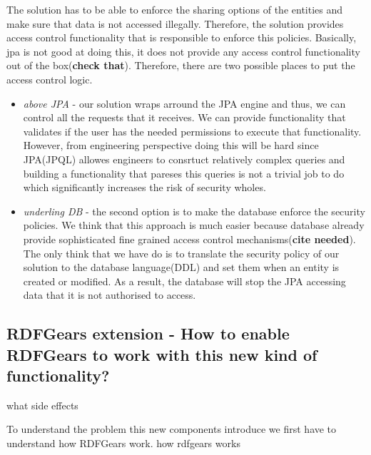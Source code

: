 \documentclass[a4paper, notitlepage]{article}
\begin{document}
The solution has to be able to enforce the sharing options of the entities and make sure that data is not accessed illegally. Therefore, the solution provides access control functionality that is responsible to enforce this policies. Basically, jpa is not good at doing this, it does not provide any access control functionality out of the box(\textbf{check that}). Therefore, there are two possible places to put the access control logic. 

\begin{itemize}
	\item \textit{above JPA} - our solution wraps arround the JPA engine and thus, we can control all the requests that it receives. We can provide functionality that validates if the user has the needed permissions to execute that functionality. However, from engineering perspective doing this will be hard since JPA(JPQL) allowes engineers to consrtuct relatively complex queries and building a functionality that pareses this queries is not a trivial job to do which significantly increases the risk of security wholes.
	
	\item \textit{underling DB} - the second option is to make the database enforce the security policies. We think that this approach is much easier because database already provide sophisticated fine grained access control mechanisms(\textbf{cite needed}). The only think that we have do is to translate the security policy of our solution to the database language(DDL) and set them when an entity is created or modified. As a result, the database will stop the JPA accessing data that it is not authorised to access.
\end{itemize}

\subsection{RDFGears extension - How to enable RDFGears to work with this new kind of functionality?}
what side effects

To understand the problem this new components introduce we first have to understand how RDFGears work. 
how rdfgears works
\end{document}
